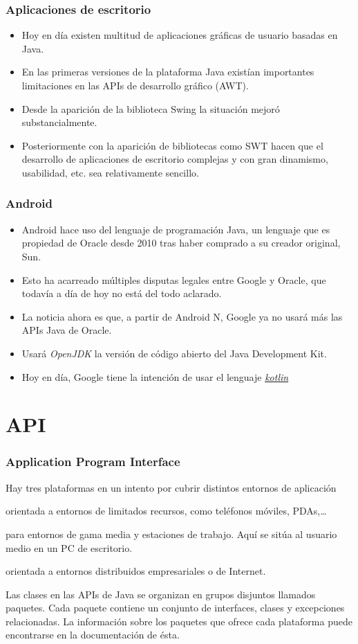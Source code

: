 \documentclass{beamer}
\begin{document}
\begin{frame}
\frametitle{Aplicaciones de escritorio}
\begin{itemize}[<+->]
\item Hoy en día existen multitud de aplicaciones gráficas de usuario basadas en Java.
\item En las primeras versiones de la plataforma Java existían importantes limitaciones en las APIs de desarrollo gráfico (AWT). 
\item Desde la aparición de la biblioteca Swing la situación mejoró substancialmente.
\item Posteriormente con la aparición de bibliotecas como SWT hacen que el desarrollo de aplicaciones de escritorio complejas y con gran dinamismo, usabilidad, etc. sea relativamente sencillo.
\end{itemize}
\end{frame}

\begin{frame}
\frametitle{Android}
\begin{itemize}[<+->]
\item Android hace uso del lenguaje de programación Java, un lenguaje que es propiedad de Oracle desde 2010 tras haber comprado a su creador original, Sun. 
\item Esto ha acarreado múltiples disputas legales entre Google y Oracle, que todavía a día de hoy no está del todo aclarado.
\item La noticia ahora es que, a partir de Android N, Google ya no usará más las APIs Java de Oracle.
\item Usará \emph{OpenJDK} la versión de código abierto del Java Development Kit.
\item Hoy en día, Google tiene la intención de usar el lenguaje \href{https://es.wikipedia.org/wiki/Kotlin\_(lenguaje\_de\_programaci\%C3\%B3n)}{\emph{kotlin}}
\end{itemize}
\end{frame}

\section{API} 

\begin{frame}
\frametitle{Application Program Interface} 
Hay tres plataformas en un intento por cubrir distintos entornos de aplicación
\pause
\begin{description}[<+->]
\item[Java ME] orientada a entornos de limitados recursos, como teléfonos móviles, PDAs,\dots
\item[Java SE] para entornos de gama media y estaciones de trabajo. Aquí se sitúa al usuario medio en un PC de escritorio.
\item[Java EE] orientada a entornos distribuidos empresariales o de Internet.
\end{description}
\pause
Las clases en las APIs de Java se organizan en grupos disjuntos llamados paquetes. Cada paquete contiene un conjunto de interfaces, clases y excepciones relacionadas. La información sobre los paquetes que ofrece cada plataforma puede encontrarse en la documentación de ésta.
\end{frame}
\end{document}
